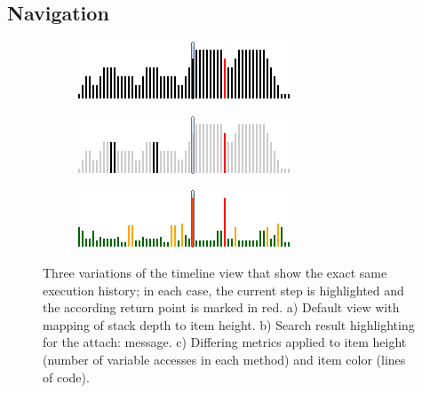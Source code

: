\subsection{Navigation}

\begin{figure}[tb]
	\centering
	
	\begin{subfigure}[b]{0.45\textwidth}
		\centering
        \includegraphics[width=\textwidth]{../images/04-ImplTimeline1}
        \caption[Default View]{}
		\label{fig:ImplementationTimelineDefault}
	\end{subfigure}
	\quad
	\begin{subfigure}[b]{0.45\textwidth}
		\centering
		\includegraphics[width=\textwidth]{../images/04-ImplTimeline2}
		\caption[Search Result Highlighting]{}
		\label{fig:ImplementationTimelineSearch}
	\end{subfigure}
	\quad
	\begin{subfigure}[b]{0.45\textwidth}
		\centering
		\includegraphics[width=\textwidth]{../images/04-ImplTimeline3}
		\caption[Differing Metrics Applied to Item Height and Color]{}
		\label{fig:ImplementationTimelineMetrics}
	\end{subfigure}
	
	\caption[Variations of the Timeline View]{Three variations of the timeline view that show the exact same execution history; in each case, the current step is highlighted and the according return point is marked in red.
		a) Default view with mapping of stack depth to item height.
		b) Search result highlighting for the attach: message.
		c) Differing metrics applied to item height (number of variable accesses in each method) and item color (lines of code).
	}
	\label{fig:ImplementationTimeline}
\end{figure}

